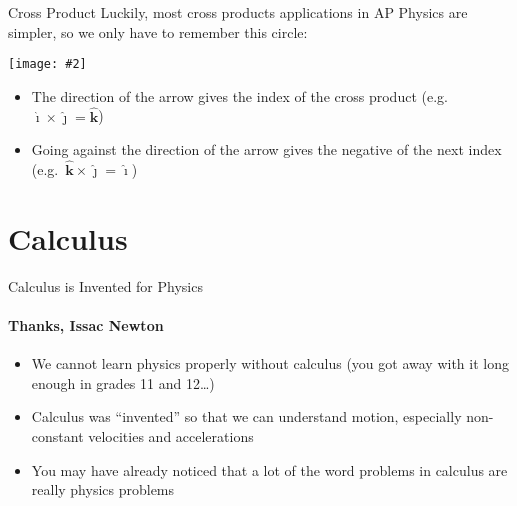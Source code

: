 \documentclass[12pt,compress,aspectratio=169]{beamer}
\newcommand{\pic}[2]{\texttt{[image: \#2]}}
\begin{document}
\begin{frame}{Cross Product}
  Luckily, most cross products applications in AP Physics are simpler, so we
  only have to remember this circle:
  \begin{center}
    \vspace{-.2in}\pic{.12}{cross-product-circle.png}
  \end{center}
  \begin{itemize}
  \item The direction of the arrow gives the index of the cross product
    (e.g.\ $\bm{\hat{\imath}}\times\bm{\hat{\jmath}}=\bm{\hat{k}}$)
  \item Going against the direction of the arrow gives the negative of the next
    index (e.g.\ $\bm{\hat{k}}\times\bm{\hat{\jmath}}=\bm{\hat{\imath}}$)
  \end{itemize}
\end{frame}


\section{Calculus}

\begin{frame}{Calculus is Invented for Physics}
  \framesubtitle{Thanks, Issac Newton}
  \begin{itemize}
  \item We cannot learn physics properly without calculus (you got away with it
    long enough in grades 11 and 12\ldots)
  \item Calculus was ``invented'' so that we can understand motion, especially
    non-constant velocities and accelerations
  \item You may have already noticed that a lot of the word problems in
    calculus are really physics problems
  \end{itemize}
\end{frame}
\end{document}
